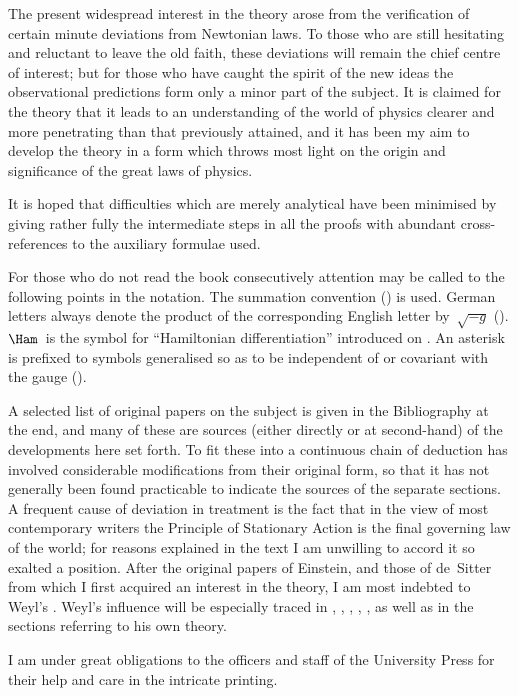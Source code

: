 \documentclass[12pt]{book}
\begin{document}
The present widespread interest in the theory arose from the verification
of certain minute deviations from Newtonian laws. To those who are still
hesitating and reluctant to leave the old faith, these deviations will remain
the chief centre of interest; but for those who have caught the spirit of the
new ideas the observational predictions form only a minor part of the subject.
It is claimed for the theory that it leads to an understanding of the world of
physics clearer and more penetrating than that previously attained, and it
has been my aim to develop the theory in a form which throws most light
on the origin and significance of the great laws of physics.

It is hoped that difficulties which are merely analytical have been minimised
by giving rather fully the intermediate steps in all the proofs with
abundant cross-references to the auxiliary formulae used.

For those who do not read the book consecutively attention may be called
to the following points in the notation. The summation convention ()
is used. German letters always denote the product of the corresponding
English letter by~$\sqrt{-g}$ (). $\Ham$~is the symbol for ``Hamiltonian differentiation''
introduced on . An asterisk is prefixed to symbols generalised
so as to be independent of or covariant with the gauge ().

A selected list of original papers on the subject is given in the Bibliography
at the end, and many of these are sources (either directly or at
second-hand) of the developments here set forth. To fit these into a continuous
chain of deduction has involved considerable modifications from their
original form, so that it has not generally been found practicable to indicate
the sources of the separate sections. A frequent cause of deviation in treatment
is the fact that in the view of most contemporary writers the Principle
of Stationary Action is the final governing law of the world; for reasons
explained in the text I am unwilling to accord it so exalted a position. After
the original papers of Einstein, and those of de~Sitter from which I first
acquired an interest in the theory, I am most indebted to Weyl's . Weyl's influence will be especially traced in , , , , , as
well as in the sections referring to his own theory.

I am under great obligations to the officers and staff of the University
Press for their help and care in the intricate printing.
\end{document}
